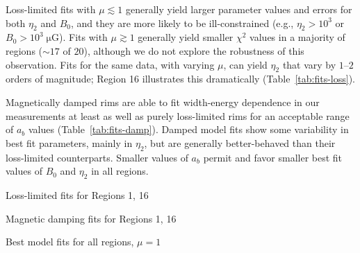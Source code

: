 \documentclass[iop, apj, numberedappendix]{emulateapj}
\newcommand*{\mt}{\mathrm}
\newcommand*{\unit}[1]{\;\mt{#1}}  %
\newcommand*{\abt}{\mathord{\sim}} %
\newcommand*{\muG}{\unit{\mu G}}
\begin{document}
Loss-limited fits with $\mu \lesssim 1$ generally yield larger parameter values
and errors for both $\eta_2$ and $B_0$, and they are more likely to be
ill-constrained (e.g., $\eta_2 > 10^3$ or $B_0 > 10^3 \muG$).  Fits with $\mu
\gtrsim 1$ generally yield smaller $\chi^2$ values in a majority of regions
($\abt 17$ of $20$), although we do not explore the robustness of this
observation.  Fits for the same data, with varying $\mu$, can yield $\eta_2$
that vary by $1$--$2$ orders of magnitude; Region 16 illustrates this
dramatically (Table~\ref{tab:fits-loss}).

Magnetically damped rims are able to fit width-energy dependence in our
measurements at least as well as purely loss-limited rims for an acceptable
range of $a_b$ values (Table~\ref{tab:fits-damp}).  Damped model fits show some
variability in best fit parameters, mainly in $\eta_2$, but are generally
better-behaved than their loss-limited counterparts.  Smaller values of $a_b$
permit and favor smaller best fit values of $B_0$ and $\eta_2$ in all regions.

\begin{table}
    \scriptsize
    \centering
    \caption{Loss-limited fits for Regions 1, 16
    \label{tab:fits-loss}}
    
\end{table}

\begin{table}
    \scriptsize
    \centering
    \caption{Magnetic damping fits for Regions 1, 16
    \label{tab:fits-damp}}
    
\end{table}

\begin{table}
    \tiny
    \centering
    \caption{Best model fits for all regions, $\mu = 1$
    \label{tab:fits-all}}
    
\end{table}
\end{document}
